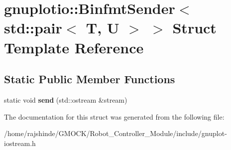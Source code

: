 \hypertarget{structgnuplotio_1_1_binfmt_sender_3_01std_1_1pair_3_01_t_00_01_u_01_4_01_4}{}\section{gnuplotio\+:\+:Binfmt\+Sender$<$ std\+:\+:pair$<$ T, U $>$ $>$ Struct Template Reference}
\label{structgnuplotio_1_1_binfmt_sender_3_01std_1_1pair_3_01_t_00_01_u_01_4_01_4}
\subsection*{Static Public Member Functions}
\begin{DoxyCompactItemize}
\item 
static void {\bfseries send} (std\+::ostream \&stream)\hypertarget{structgnuplotio_1_1_binfmt_sender_3_01std_1_1pair_3_01_t_00_01_u_01_4_01_4_a08b2bedbc54824cd202c664116e37243}{}\label{structgnuplotio_1_1_binfmt_sender_3_01std_1_1pair_3_01_t_00_01_u_01_4_01_4_a08b2bedbc54824cd202c664116e37243}

\end{DoxyCompactItemize}


The documentation for this struct was generated from the following file\+:\begin{DoxyCompactItemize}
\item 
/home/rajshinde/\+G\+M\+O\+C\+K/\+Robot\+\_\+\+Controller\+\_\+\+Module/include/gnuplot-\/iostream.\+h\end{DoxyCompactItemize}
